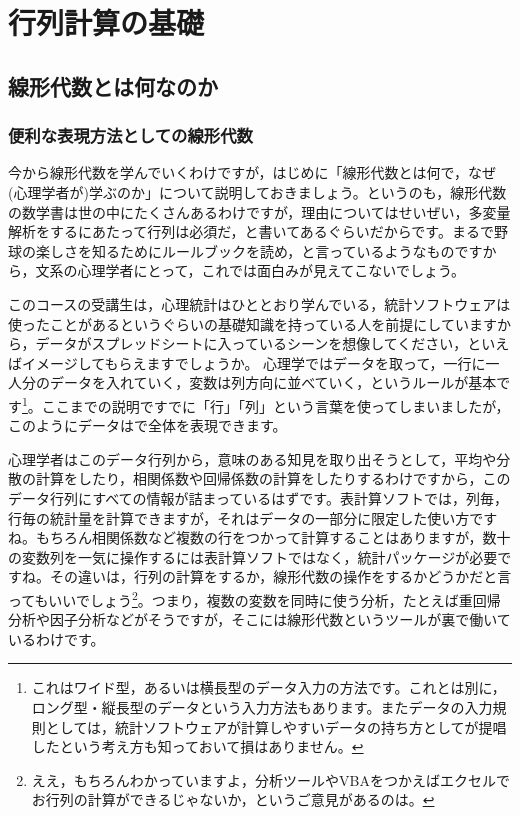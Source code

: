\documentclass{ltjsbook}
\begin{document}
\chapter{行列計算の基礎}
\label{L01_LinearAlgebra}
\section{線形代数とは何なのか}
\subsection{便利な表現方法としての線形代数}
今から線形代数を学んでいくわけですが，はじめに「線形代数とは何で，なぜ(心理学者が)学ぶのか」について説明しておきましょう。というのも，線形代数の数学書は世の中にたくさんあるわけですが，理由についてはせいぜい，多変量解析をするにあたって行列は必須だ，と書いてあるぐらいだからです。まるで野球の楽しさを知るためにルールブックを読め，と言っているようなものですから，文系の心理学者にとって，これでは面白みが見えてこないでしょう。

このコースの受講生は，心理統計はひととおり学んでいる，統計ソフトウェアは使ったことがあるというぐらいの基礎知識を持っている人を前提にしていますから，データがスプレッドシートに入っているシーンを想像してください，といえばイメージしてもらえますでしょうか。
心理学ではデータを取って，一行に一人分のデータを入れていく，変数は列方向に並べていく，というルールが基本です\footnote{これはワイド型，あるいは横長型のデータ入力の方法です。これとは別に，ロング型・縦長型のデータという入力方法もあります。またデータの入力規則としては，統計ソフトウェアが計算しやすいデータの持ち方として\citet{Hadley2014}が提唱したという考え方も知っておいて損はありません。}。ここまでの説明ですでに「行」「列」という言葉を使ってしまいましたが，このようにデータはで全体を表現できます。

心理学者はこのデータ行列から，意味のある知見を取り出そうとして，平均や分散の計算をしたり，相関係数や回帰係数の計算をしたりするわけですから，このデータ行列にすべての情報が詰まっているはずです。表計算ソフトでは，列毎，行毎の統計量を計算できますが，それはデータの一部分に限定した使い方ですね。もちろん相関係数など複数の行をつかって計算することはありますが，数十の変数列を一気に操作するには表計算ソフトではなく，統計パッケージが必要ですね。その違いは，行列の計算をするか，線形代数の操作をするかどうかだと言ってもいいでしょう\footnote{ええ，もちろんわかっていますよ，分析ツールやVBAをつかえばエクセルでお行列の計算ができるじゃないか，というご意見があるのは。}。つまり，複数の変数を同時に使う分析，たとえば重回帰分析や因子分析などがそうですが，そこには線形代数というツールが裏で働いているわけです。
\end{document}
